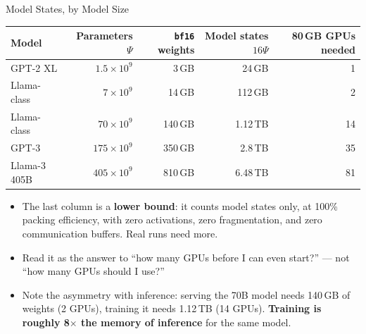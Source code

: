 \begin{frame}{Model States, by Model Size}
  \centering
  \footnotesize
  \begin{tabular}{@{}lrrrr@{}}
    \toprule
    \textbf{Model} & \textbf{Parameters $\Psi$} & \textbf{\texttt{bf16} weights} & \textbf{Model states $16\Psi$} & \textbf{80\,GB GPUs needed} \\
    \midrule
    GPT-2 XL     & $1.5 \times 10^{9}$   & 3\,GB    & 24\,GB    & 1 \\
    Llama-class  & $7 \times 10^{9}$     & 14\,GB   & 112\,GB   & 2 \\
    Llama-class  & $70 \times 10^{9}$    & 140\,GB  & 1.12\,TB  & 14 \\
    GPT-3        & $175 \times 10^{9}$   & 350\,GB  & 2.8\,TB   & 35 \\
    Llama-3 405B & $405 \times 10^{9}$   & 810\,GB  & 6.48\,TB  & 81 \\
    \bottomrule
  \end{tabular}
  \vspace{0.8em}
  \begin{itemize}\footnotesize\itemsep0.3em
    \item[\textcolor{red}{$\blacktriangleright$}] The last column is a \textbf{lower bound}: it counts model states only, at 100\% packing efficiency, with zero activations, zero fragmentation, and zero communication buffers. Real runs need more.
    \item[\textcolor{red}{$\blacktriangleright$}] Read it as the answer to ``how many GPUs before I can even start?'' --- not ``how many GPUs should I use?''
    \item[\textcolor{red}{$\blacktriangleright$}] Note the asymmetry with inference: serving the 70B model needs 140\,GB of weights (2 GPUs), training it needs 1.12\,TB (14 GPUs). \textbf{Training is roughly 8$\times$ the memory of inference} for the same model.
  \end{itemize}
\end{frame}

